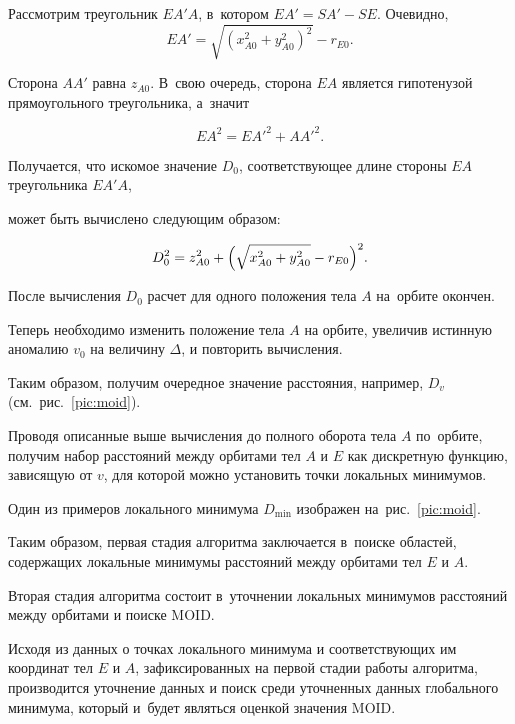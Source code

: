Рассмотрим треугольник $EA'A$, в~котором $EA' = SA' - SE$. Очевидно, $$EA'= \sqrt{(x_{A0}^2 + y_{A0}^2)^2}  - r_{E0}.$$ 

Сторона $AA'$ равна $z_{A0}$. В~свою очередь, сторона $EA$ является гипотенузой прямоугольного треугольника, а~значит 

$$EA^2 = EA'^2+AA'^2.$$



Получается, что искомое значение $D_0$, соответствующее длине стороны $EA$ треугольника $EA'A$, 

может быть вычислено следующим образом:

\begin{equation*}

	D_0^2 = z_{A0}^2 + \Bigl(\sqrt{x_{A0}^2 + y_{A0}^2} - r_{E0}\Bigr)^2.

\end{equation*}



После вычисления $D_0$ расчет для одного положения тела $A$ на~орбите окончен. 

Теперь необходимо изменить положение тела $A$ на орбите, увеличив истинную аномалию  $v_0$ на величину $\Delta$, и повторить вычисления. 

Таким образом, получим очередное значение расстояния, например, $D_v$ (см.~рис.~\ref{pic:moid}).



Проводя описанные выше вычисления до полного оборота тела $A$ по~орбите, получим набор расстояний между орбитами тел $A$ и $E$ как дискретную функцию, зависящую от $v$, для которой можно установить точки локальных минимумов. 

Один из примеров локального минимума $D_{\min}$ изображен на~рис.~\ref{pic:moid}.



Таким образом, первая стадия алгоритма заключается в~поиске областей, содержащих локальные минимумы расстояний между орбитами тел $E$ и $A$.



Вторая стадия алгоритма состоит в~уточнении локальных минимумов расстояний между орбитами и поиске MOID. 

Исходя из данных о точках локального минимума и соответствующих им координат тел $E$ и $A$, зафиксированных на первой стадии работы алгоритма, производится уточнение данных и поиск среди уточненных данных глобального минимума, который и~будет являться оценкой значения MOID. 



